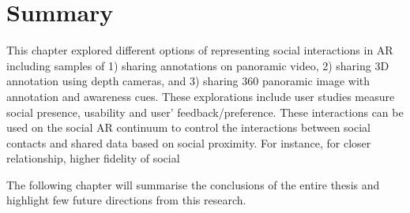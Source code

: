 \section{Summary}

This chapter explored different options of representing social interactions in AR including samples of 1) sharing annotations on panoramic video, 2) sharing 3D annotation using depth cameras, and 3) sharing 360 panoramic image with annotation and awareness cues. These explorations include user studies measure social presence, usability and user' feedback/preference. These interactions can be used on the social AR continuum to control the interactions between social contacts and shared data based on social proximity. For instance, for closer relationship, higher fidelity of social 

The following chapter will summarise the conclusions of the entire thesis and highlight few future directions from this research.
